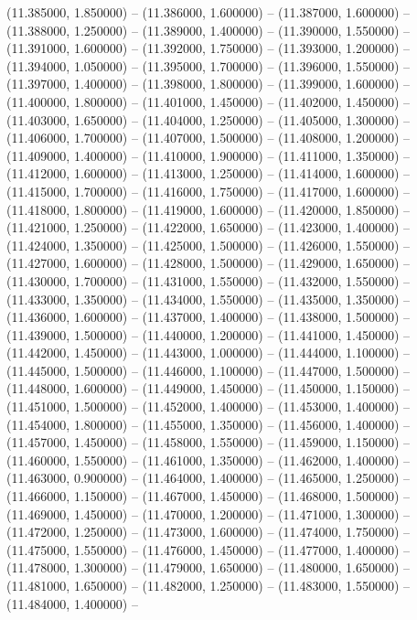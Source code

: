 (11.385000, 1.850000) -- 
(11.386000, 1.600000) -- 
(11.387000, 1.600000) -- 
(11.388000, 1.250000) -- 
(11.389000, 1.400000) -- 
(11.390000, 1.550000) -- 
(11.391000, 1.600000) -- 
(11.392000, 1.750000) -- 
(11.393000, 1.200000) -- 
(11.394000, 1.050000) -- 
(11.395000, 1.700000) -- 
(11.396000, 1.550000) -- 
(11.397000, 1.400000) -- 
(11.398000, 1.800000) -- 
(11.399000, 1.600000) -- 
(11.400000, 1.800000) -- 
(11.401000, 1.450000) -- 
(11.402000, 1.450000) -- 
(11.403000, 1.650000) -- 
(11.404000, 1.250000) -- 
(11.405000, 1.300000) -- 
(11.406000, 1.700000) -- 
(11.407000, 1.500000) -- 
(11.408000, 1.200000) -- 
(11.409000, 1.400000) -- 
(11.410000, 1.900000) -- 
(11.411000, 1.350000) -- 
(11.412000, 1.600000) -- 
(11.413000, 1.250000) -- 
(11.414000, 1.600000) -- 
(11.415000, 1.700000) -- 
(11.416000, 1.750000) -- 
(11.417000, 1.600000) -- 
(11.418000, 1.800000) -- 
(11.419000, 1.600000) -- 
(11.420000, 1.850000) -- 
(11.421000, 1.250000) -- 
(11.422000, 1.650000) -- 
(11.423000, 1.400000) -- 
(11.424000, 1.350000) -- 
(11.425000, 1.500000) -- 
(11.426000, 1.550000) -- 
(11.427000, 1.600000) -- 
(11.428000, 1.500000) -- 
(11.429000, 1.650000) -- 
(11.430000, 1.700000) -- 
(11.431000, 1.550000) -- 
(11.432000, 1.550000) -- 
(11.433000, 1.350000) -- 
(11.434000, 1.550000) -- 
(11.435000, 1.350000) -- 
(11.436000, 1.600000) -- 
(11.437000, 1.400000) -- 
(11.438000, 1.500000) -- 
(11.439000, 1.500000) -- 
(11.440000, 1.200000) -- 
(11.441000, 1.450000) -- 
(11.442000, 1.450000) -- 
(11.443000, 1.000000) -- 
(11.444000, 1.100000) -- 
(11.445000, 1.500000) -- 
(11.446000, 1.100000) -- 
(11.447000, 1.500000) -- 
(11.448000, 1.600000) -- 
(11.449000, 1.450000) -- 
(11.450000, 1.150000) -- 
(11.451000, 1.500000) -- 
(11.452000, 1.400000) -- 
(11.453000, 1.400000) -- 
(11.454000, 1.800000) -- 
(11.455000, 1.350000) -- 
(11.456000, 1.400000) -- 
(11.457000, 1.450000) -- 
(11.458000, 1.550000) -- 
(11.459000, 1.150000) -- 
(11.460000, 1.550000) -- 
(11.461000, 1.350000) -- 
(11.462000, 1.400000) -- 
(11.463000, 0.900000) -- 
(11.464000, 1.400000) -- 
(11.465000, 1.250000) -- 
(11.466000, 1.150000) -- 
(11.467000, 1.450000) -- 
(11.468000, 1.500000) -- 
(11.469000, 1.450000) -- 
(11.470000, 1.200000) -- 
(11.471000, 1.300000) -- 
(11.472000, 1.250000) -- 
(11.473000, 1.600000) -- 
(11.474000, 1.750000) -- 
(11.475000, 1.550000) -- 
(11.476000, 1.450000) -- 
(11.477000, 1.400000) -- 
(11.478000, 1.300000) -- 
(11.479000, 1.650000) -- 
(11.480000, 1.650000) -- 
(11.481000, 1.650000) -- 
(11.482000, 1.250000) -- 
(11.483000, 1.550000) -- 
(11.484000, 1.400000) -- 
